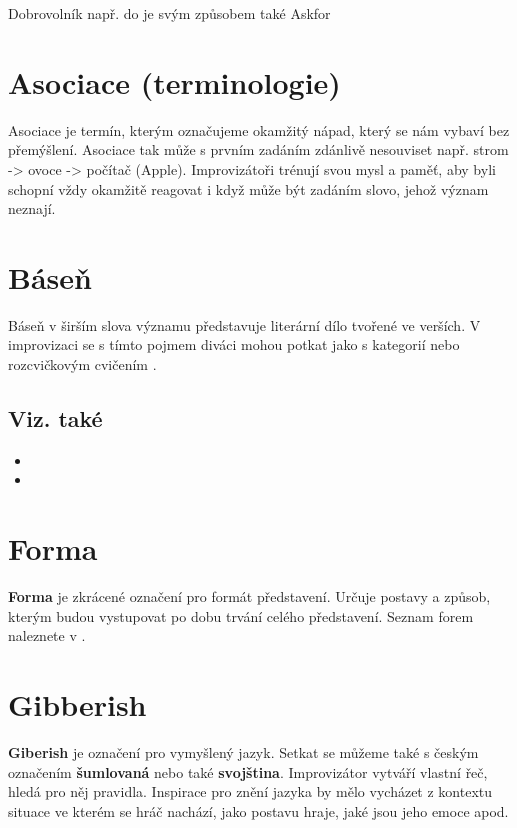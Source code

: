 Dobrovolník např. do  je svým způsobem také Askfor 
 
 
\needspace{5cm} \section{Asociace (terminologie)} \label{asociace (terminologie)} Asociace je termín, kterým označujeme okamžitý nápad, který se nám vybaví bez přemýšlení. Asociace tak může s prvním zadáním zdánlivě nesouviset např. strom -> ovoce -> počítač (Apple). Improvizátoři trénují svou mysl a paměť, aby byli schopní vždy okamžitě reagovat i když může být zadáním slovo, jehož význam neznají. 
 
 
\needspace{5cm} \section{Báseň} \label{báseň} Báseň v širším slova významu představuje literární dílo tvořené ve verších. 
V improvizaci se s tímto pojmem diváci mohou potkat jako s kategorií  nebo rozcvičkovým cvičením . 
 
\subsection{Viz. také} \begin{itemize}
\item {}
\item {}
\end{itemize}
 
 
\needspace{5cm} \section{Forma} \label{forma} \textbf{Forma}{} je zkrácené označení pro formát představení. Určuje postavy a způsob, kterým budou vystupovat po dobu trvání celého představení. Seznam forem naleznete v . 
 
 
\needspace{5cm} \section{Gibberish} \label{gibberish} \textbf{Giberish}{} je označení pro vymyšlený jazyk. Setkat se můžeme také s českým označením \textbf{šumlovaná}{} nebo také \textbf{svojština}{}. Improvizátor vytváří vlastní řeč, hledá pro něj pravidla. Inspirace pro znění jazyka by mělo vycházet z kontextu situace ve kterém se hráč nachází, jako postavu hraje, jaké jsou jeho emoce apod. 
 
